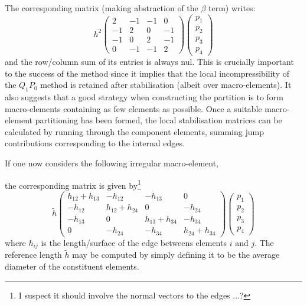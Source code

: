 The corresponding matrix (making abstraction of the $\beta$ term) writes:
\[
h^2
\left(
\begin{array}{cccc}
2 & -1 & -1 &0 \\
-1 & 2 & 0 & -1 \\
-1 & 0 & 2 & -1 \\
0 & -1 & -1 & 2
\end{array}
\right)
\left(
\begin{array}{c}
p_1 \\ p_2 \\ p_3 \\ p_4
\end{array}
\right)
\]
and the row/column sum of its entries is always nul.
This is crucially important to the success of the method since it implies
that the local incompressibility of the $Q_1P_0$ method is retained
after stabilisation (albeit over macro-elements).
It also suggests that a good strategy when constructing the partition 
is to form macro-elements containing as few elements as possible. 
Once a suitable macro-element partitioning has been formed, the local stabilisation
matrices can be calculated by running through the component elements, 
summing jump contributions corresponding to the internal edges. 

If one now considers the following irregular macro-element,
\begin{center}

\end{center}


the corresponding matrix is given by\footnote{I suspect it should involve the normal vectors
to the edges ...?}
\[
\tilde{h}
\left(
\begin{array}{cccc}
h_{12}+h_{13} & -h_{12} & -h_{13} & 0\\
-h_{12} & h_{12}+h_{24} & 0 & -h_{24} \\
-h_{13} & 0 & h_{13}+h_{34} & -h_{34} \\
0 & -h_{24} & -h_{34} & h_{24} + h_{34}
\end{array}
\right)
\left(
\begin{array}{c}
p_1 \\ p_2 \\ p_3 \\ p_4
\end{array}
\right)
\]
where $h_{ij}$ is the length/surface of the edge betweens elements $i$ and $j$. 
The reference length $\tilde{h}$ may be computed by simply defining it to be the average 
diameter of the constituent elements. 

